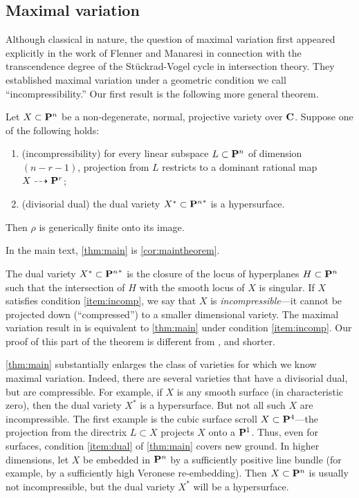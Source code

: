 \documentclass[11pt,reqno]{amsart}
\theoremstyle{plain}
\theoremstyle{definition}
\theoremstyle{remark}
\numberwithin{equation}{section}
\numberwithin{equation}{section}
\begin{document}
\subsection{Maximal variation}
Although classical in nature, the question of maximal variation first appeared explicitly in the work of Flenner and Manaresi \cite{fle.man:98} in connection with the transcendence degree of the St\"uckrad-Vogel cycle in intersection theory. 
They established maximal variation under a geometric condition we call ``incompressibility.''
Our first result is the following more general theorem.
\begin{maintheorem}\label{thm:main}
  Let $X \subset \P^n$ be a non-degenerate, normal, projective variety over $\C$.
  Suppose one of the following holds:
  \begin{enumerate}
  \item\label{item:incomp}(incompressibility) for every linear subspace $L \subset \P^n$ of dimension $(n-r-1)$, projection from $L$ restricts to a dominant rational map $X \dashrightarrow \P^r$;
  \item\label{item:dual}(divisorial dual) the dual variety $X^* \subset {\P^n}^*$ is a hypersurface.
  \end{enumerate}
  Then $\rho$ is generically finite onto its image.
\end{maintheorem}
In the main text, \autoref{thm:main} is \autoref{cor:maintheorem}.

The dual variety $X^* \subset {\P^n}^*$ is the closure of the locus of hyperplanes $H \subset \P^n$ such that the intersection of $H$ with the smooth locus of $X$ is singular.
If $X$ satisfies condition \eqref{item:incomp}, we say that $X$ is \emph{incompressible}---it cannot be projected down (``compressed'') to a smaller dimensional variety.
The maximal variation result in \cite{fle.man:98} is equivalent to \autoref{thm:main} under condition \eqref{item:incomp}.
Our proof of this part of the theorem is different from \cite{fle.man:98}, and shorter.


\autoref{thm:main} substantially enlarges the class of varieties for which we know maximal variation.
Indeed, there are several varieties that have a divisorial dual, but are compressible.
For example, if $X$ is any smooth surface (in characteristic zero), then the dual variety $X^*$ is a hypersurface.
But not all such $X$ are incompressible.
The first example is the cubic surface scroll $X \subset \P^4$---the projection from the directrix $L \subset X$ projects $X$ onto a $\P^1$.
Thus, even for surfaces, condition \eqref{item:dual} of \autoref{thm:main} covers new ground.
In higher dimensions, let $X$ be embedded in $\P^n$ by a sufficiently positive line bundle (for example, by a sufficiently high Veronese re-embedding).
Then $X \subset \P^n$ is usually not incompressible, but the dual variety $X^*$ will be a hypersurface.
\end{document}
